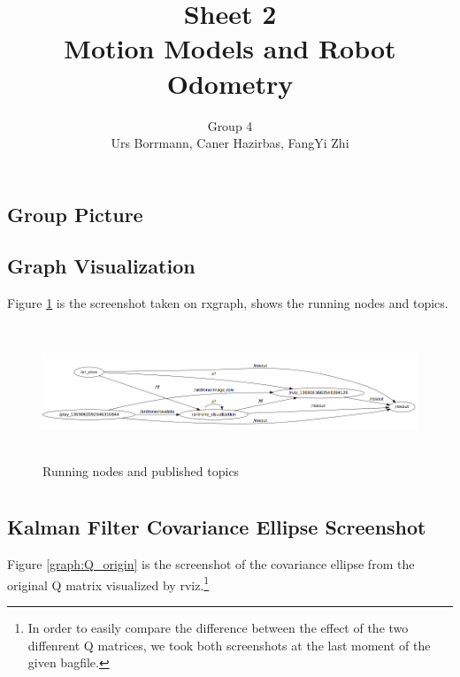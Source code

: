\documentclass[14pt,a4paper]{article}
\title{\textbf{Sheet 2} \\  \textbf{Motion Models and Robot Odometry}}
\author{Group 4 \\Urs Borrmann, Caner Hazirbas, FangYi Zhi}
\begin{document}
\maketitle
\onehalfspacing

\section{}
	\subsection{Group Picture}


	\subsection{Graph Visualization}

	Figure \ref{graph:rxgraph} is the screenshot taken on rxgraph, shows the running nodes and topics.\\
	
	\begin{figure}[htbp]
	\centering
	\includegraphics[width=165mm,height=40mm]{rxgraph.png}
  	\caption{Running nodes and published topics}
    \label{graph:rxgraph}
	\end{figure}

\section{}
	\subsection{Kalman Filter Covariance Ellipse Screenshot}
		Figure \ref{graph:Q_origin} is the screenshot of the covariance ellipse from the original Q matrix visualized by rviz.\footnote{In order to easily compare the difference between the effect of the two diffenrent Q matrices, we took both screenshots at the last moment of the given bagfile.}\\
	
\end{document}
